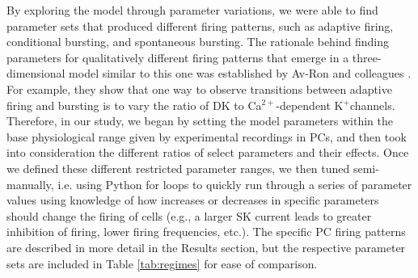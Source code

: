 \documentclass[10pt,letterpaper]{article}
\newcommand{\Ca}{Ca$^{2+}$}
\newcommand{\K}{K$^{+}$}
\begin{document}
By exploring the model through parameter variations, we were able to find parameter sets that produced different firing patterns, such as adaptive firing, conditional bursting, and spontaneous bursting. The rationale behind finding parameters for qualitatively different firing patterns that emerge in a three-dimensional model similar to this one was established by Av-Ron and colleagues \cite{avron1993basic}. For example, they show that one way to observe transitions between adaptive firing and bursting is to vary the ratio of DK to \Ca-dependent \K channels. Therefore, in our study, we began by setting the model parameters within the base physiological range given by experimental recordings in PCs, and then took into consideration the different ratios of select parameters and their effects. Once we defined these different restricted parameter ranges, we then tuned semi-manually, i.e. using Python for loops to quickly run through a series of parameter values using knowledge of how increases or decreases in specific parameters should change the firing of cells (e.g., a larger SK current leads to greater inhibition of firing, lower firing frequencies, etc.). The specific PC firing patterns are described in more detail in the Results section, but the respective parameter sets are included in Table \ref{tab:regimes} for ease of comparison.
\end{document}
